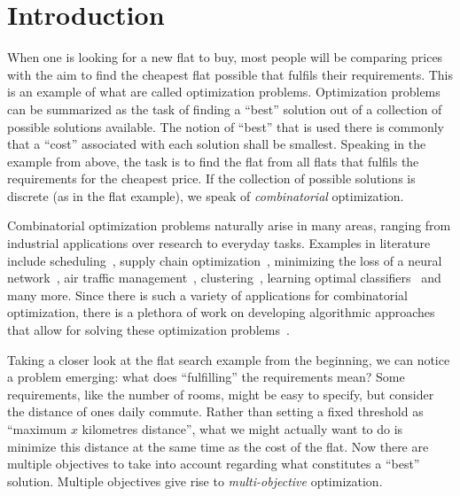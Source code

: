 \chapter{Introduction\label{chap:intro}}

When one is looking for a new flat to buy, most people will be comparing prices with the aim to find the cheapest flat possible that fulfils their requirements.
This is an example of what are called optimization problems.
Optimization problems can be summarized as the task of finding a ``best'' solution out of a collection of possible solutions available.
The notion of ``best'' that is used there is commonly that a ``cost'' associated with each solution shall be smallest.
Speaking in the example from above, the task is to find the flat from all flats that fulfils the requirements for the cheapest price.
If the collection of possible solutions is discrete (as in the flat example), we speak of \emph{combinatorial} optimization.

Combinatorial optimization problems naturally arise in many areas, ranging from industrial applications over research to everyday tasks.
Examples in literature include scheduling~\autocite{DBLP:conf/cp/Stojadinovic14,DBLP:conf/cpaior/BofillGSV15,DBLP:journals/ior/Solomon87,DBLP:journals/candie/AkyolB07}, supply chain optimization~\autocite{}, minimizing the loss of a neural network~\autocite{}, air traffic management~\autocite{DBLP:journals/ior/BertsimasLO11,RichardsHow2002Aircrafttrajectoryplanning}, clustering~\autocite{DBLP:journals/ai/DaoDV17,DBLP:conf/sdm/DavidsonRS10}, learning optimal classifiers~\autocite{DBLP:conf/cp/MaliotovM18,DBLP:conf/ijcai/NarodytskaIPM18,DBLP:conf/ijcai/Hu0HH20,DBLP:conf/cp/YuISB20,DBLP:conf/aaai/DemirovicS21,DBLP:conf/cp/ShatiCM21} and many more.
Since there is such a variety of applications for combinatorial optimization, there is a plethora of work on developing algorithmic approaches that allow for solving these optimization problems~\autocite{}.

Taking a closer look at the flat search example from the beginning, we can notice a problem emerging:
what does ``fulfilling'' the requirements mean?
Some requirements, like the number of rooms, might be easy to specify, but consider the distance of ones daily commute.
Rather than setting a fixed threshold as ``maximum $x$ kilometres distance'', what we might actually want to do is minimize this distance at the same time as the cost of the flat.
Now there are multiple objectives to take into account regarding what constitutes a ``best'' solution.
Multiple objectives give rise to \emph{multi-objective} optimization.

